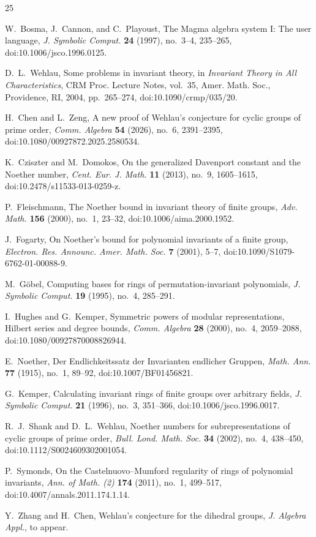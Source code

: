 \documentclass[11pt]{article}
\theoremstyle{definition}
\begin{document}
\begin{thebibliography}{25}

 W.~Bosma, J.~Cannon, and C.~Playoust, The Magma algebra system I: The user language, \emph{J. Symbolic Comput.} \textbf{24} (1997), no.~3--4, 235--265, doi:10.1006/jsco.1996.0125.

 D.~L.~Wehlau, Some problems in invariant theory, in \emph{Invariant Theory in All Characteristics}, CRM Proc. Lecture Notes, vol.~35, Amer. Math. Soc., Providence, RI, 2004, pp.~265--274, doi:10.1090/crmp/035/20.

 H.~Chen and L.~Zeng, A new proof of Wehlau's conjecture for cyclic groups of prime order, \emph{Comm. Algebra} \textbf{54} (2026), no.~6, 2391--2395, doi:10.1080/00927872.2025.2580534.

 K.~Cziszter and M.~Domokos, On the generalized Davenport constant and the Noether number, \emph{Cent. Eur. J. Math.} \textbf{11} (2013), no.~9, 1605--1615, doi:10.2478/s11533-013-0259-z.

 P.~Fleischmann, The Noether bound in invariant theory of finite groups, \emph{Adv. Math.} \textbf{156} (2000), no.~1, 23--32, doi:10.1006/aima.2000.1952.

 J.~Fogarty, On Noether's bound for polynomial invariants of a finite group, \emph{Electron. Res. Announc. Amer. Math. Soc.} \textbf{7} (2001), 5--7, doi:10.1090/S1079-6762-01-00088-9.

 M.~G\"obel, Computing bases for rings of permutation-invariant polynomials, \emph{J. Symbolic Comput.} \textbf{19} (1995), no.~4, 285--291.

 I.~Hughes and G.~Kemper, Symmetric powers of modular representations, Hilbert series and degree bounds, \emph{Comm. Algebra} \textbf{28} (2000), no.~4, 2059--2088, doi:10.1080/00927870008826944.

 E.~Noether, Der Endlichkeitssatz der Invarianten endlicher Gruppen, \emph{Math. Ann.} \textbf{77} (1915), no.~1, 89--92, doi:10.1007/BF01456821.

 G.~Kemper, Calculating invariant rings of finite groups over arbitrary fields, \emph{J. Symbolic Comput.} \textbf{21} (1996), no.~3, 351--366, doi:10.1006/jsco.1996.0017.

 R.~J.~Shank and D.~L.~Wehlau, Noether numbers for subrepresentations of cyclic groups of prime order, \emph{Bull. Lond. Math. Soc.} \textbf{34} (2002), no.~4, 438--450, doi:10.1112/S0024609302001054.

 P.~Symonds, On the Castelnuovo--Mumford regularity of rings of polynomial invariants, \emph{Ann. of Math. (2)} \textbf{174} (2011), no.~1, 499--517, doi:10.4007/annals.2011.174.1.14.

 Y.~Zhang and H.~Chen, Wehlau's conjecture for the dihedral groups, \emph{J. Algebra Appl.}, to appear.
\end{thebibliography}
\end{document}
